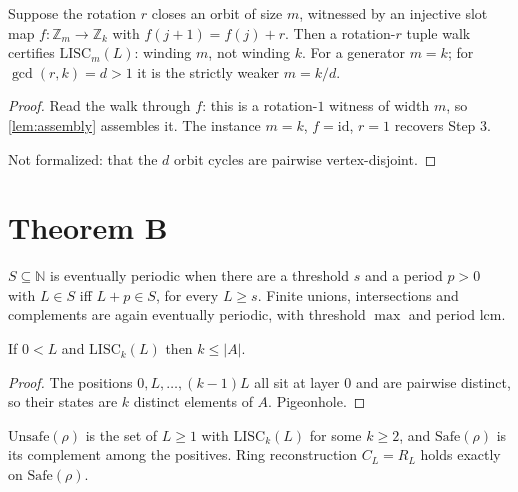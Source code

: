 \begin{lemma}
\label{lem:ng}
\leanok
{}
Suppose the rotation $r$ closes an orbit of size $m$, witnessed by an injective
slot map $f : \mathbb{Z}_m \to \mathbb{Z}_k$ with $f(j+1) = f(j) + r$. Then a
rotation-$r$ tuple walk certifies $\mathrm{LISC}_m(L)$: winding $m$, not
winding $k$. For a generator $m = k$; for $\gcd(r,k) = d > 1$ it is the
strictly weaker $m = k/d$.
\end{lemma}

\begin{proof}
\leanok
{}
Read the walk through $f$: this is a rotation-$1$ witness of width $m$, so
\ref{lem:assembly} assembles it. The instance $m=k$, $f = \mathrm{id}$, $r=1$
recovers Step 3.

Not formalized: that the $d$ orbit cycles are pairwise vertex-disjoint.
\end{proof}

\section{Theorem B}

\begin{definition}
\label{def:evperiodic}
\leanok
$S \subseteq \mathbb{N}$ is eventually periodic when there are a threshold $s$
and a period $p > 0$ with $L \in S$ iff $L+p \in S$, for every $L \geq s$.
Finite unions, intersections and complements are again eventually periodic,
with threshold $\max$ and period $\mathrm{lcm}$.
\end{definition}

\begin{lemma}
\label{lem:kcap}
\leanok
{}
If $0 < L$ and $\mathrm{LISC}_k(L)$ then $k \leq |A|$.
\end{lemma}

\begin{proof}
\leanok
{}
The positions $0, L, \dots, (k-1)L$ all sit at layer $0$ and are pairwise
distinct, so their states are $k$ distinct elements of $A$. Pigeonhole.
\end{proof}

\begin{definition}
\label{def:unsafe-safe}
\leanok
{}
$\mathrm{Unsafe}(\rho)$ is the set of $L \geq 1$ with $\mathrm{LISC}_k(L)$ for
some $k \geq 2$, and $\mathrm{Safe}(\rho)$ is its complement among the
positives. Ring reconstruction $C_L = R_L$ holds exactly on
$\mathrm{Safe}(\rho)$.
\end{definition}

